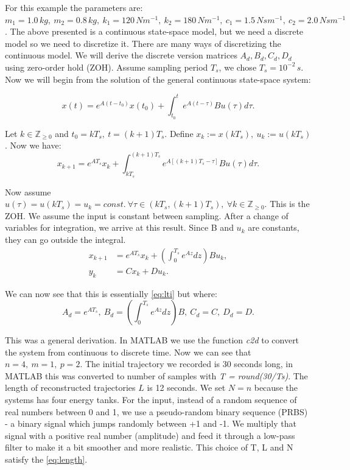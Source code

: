 \documentclass[12pt,a4paper]{report}
\begin{document}
For this example the parameters are: $m_1 = 1.0\,kg,\ m_2 = 0.8\,kg,\ k_1=120\,Nm^{-1},\ k_2=180\,Nm^{-1},\ c_1=1.5\,Nsm^{-1},\ c_2=2.0\,Nsm^{-1}$.
The above presented is a continuous state-space model, but we need a discrete model so we need to discretize it. There are many ways of discretizing the continuous model. We will derive the discrete version matrices
$A_d, B_d, C_d, D_d$ using zero-order hold (ZOH). Assume sampling period $T_s$, we chose $T_s = 10^{-2}\,s$. Now we will begin from the solution of the general continuous state-space system:

\[x(t) = e^{A(t-t_0)}x(t_0) + \int_{t_0}^{t}e^{A(t-\tau)}Bu(\tau)d\tau.\]

\clearpage

Let \(k \in \mathbb{Z}_{\geq 0}\) and \(t_0 = kT_s, \ t = (k+1)T_s\). Define \(x_k:=x(kT_s), \ u_k:=u(kT_s)\). Now we have:
\[x_{k+1} = e^{AT_s}x_k + \int_{kT_s}^{(k+1)T_s}e^{A[(k+1)T_s - \tau]}Bu(\tau)d\tau.\]

Now assume \(u(\tau) = u(kT_s) = u_k = const. \ \forall \tau \in (kT_s, (k+1)T_s), \ \forall k \in \mathbb{Z}_{\geq 0}\). This is the ZOH. We assume the input is constant between sampling. After a change of variables
for integration, we arrive at this result. Since B and $u_k$ are constants, they can go outside the integral.
\begin{align*}
    x_{k+1} &= e^{AT_s}x_k + \left(\int_{0}^{T_s}e^{Az}dz\right)Bu_k, \\
    y_k &= Cx_k + Du_k.
\end{align*}

We can now see that this is essentially \eqref{eq:lti} but where:
\[A_d = e^{AT_s}, \ B_d = \left(\int_{0}^{T_s}e^{Az}dz\right)B, \ C_d = C, \ D_d = D.\]

This was a general derivation. In MATLAB we use the function \textit{c2d} to convert the system from continuous to discrete time. Now we can see that $n=4, \ m=1, \ p=2$. The initial trajectory we recorded
is 30 seconds long, in MATLAB this was converted to number of samples with \textit{T = round(30/Ts)}. The length of reconstructed trajectories $L$ is 12 seconds. We set $N=n$ because the systems has four
energy tanks. For the input, instead of a random sequence of real numbers between 0 and 1, we use a pseudo-random binary sequence (PRBS) - a binary signal which jumps randomly between +1 and -1. We multiply
that signal with a positive real number (amplitude) and feed it through a low-pass filter to make it a bit smoother and more realistic. This choice of T, L and N satisfy the \eqref{eq:length}.
\end{document}
